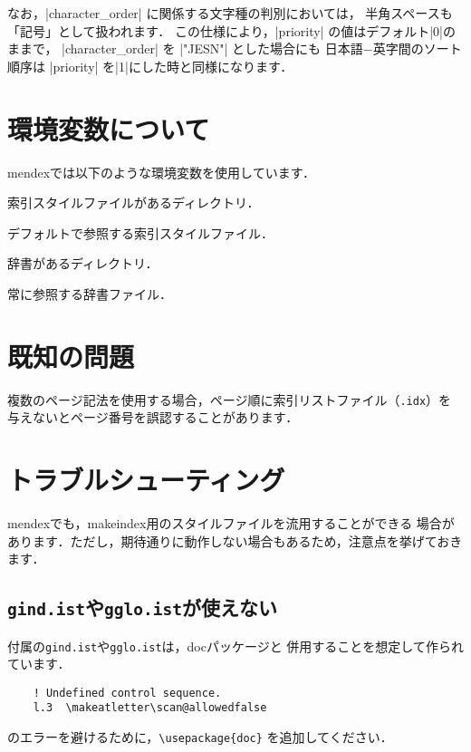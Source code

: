\documentclass[a4paper,dvipdfmx]{jsarticle}
\newcommand{\SoftName}[1]{\textsf{#1}}
\newcommand{\FileName}[1]{\texttt{#1}}
\newcommand{\FileExtension}[1]{\texttt{.#1}}
\begin{document}
なお，|character_order| に関係する文字種の判別においては，
半角スペースも「記号」として扱われます．
この仕様により，|priority| の値はデフォルト|0|のままで，
|character_order| を |"JESN"| とした場合にも
日本語−英字間のソート順序は |priority| を|1|にした時と同様になります．

\section{環境変数について}

\SoftName{mendex}では以下のような環境変数を使用しています．

\begin{description}[leftmargin=5cm]
\item[|INDEXSTYLE|]
索引スタイルファイルがあるディレクトリ．

\item[|INDEXDEFAULTSTYLE|]
デフォルトで参照する索引スタイルファイル．

\item[|INDEXDICTIONARY|]
辞書があるディレクトリ．

\item[|INDEXDEFAULTDICTIONARY|]
常に参照する辞書ファイル．
\end{description}

\section{既知の問題}
複数のページ記法を使用する場合，ページ順に索引リストファイル（\FileExtension{idx}）を
与えないとページ番号を誤認することがあります．


\section{トラブルシューティング}
\SoftName{mendex}でも，\SoftName{makeindex}用のスタイルファイルを流用することができる
場合があります．ただし，期待通りに動作しない場合もあるため，注意点を挙げておきます．

\subsection{\FileName{gind.ist}や\FileName{gglo.ist}が使えない}
\LaTeXe 付属の\FileName{gind.ist}や\FileName{gglo.ist}は，\SoftName{doc}パッケージと
併用することを想定して作られています．
\begin{verbatim}
    ! Undefined control sequence.
    l.3  \makeatletter\scan@allowedfalse
\end{verbatim}
のエラーを避けるために，\verb+\usepackage{doc}+ を追加してください．
\end{document}
